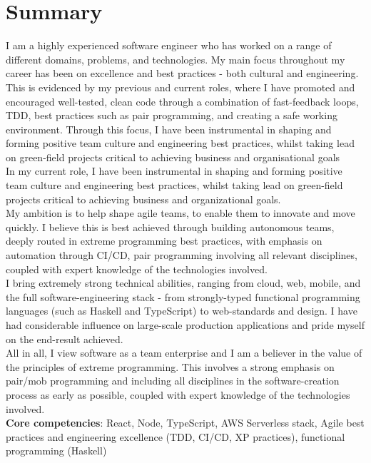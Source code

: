 \section{Summary}

I am a highly experienced software engineer who has worked on a range of different domains, problems, and technologies. My main focus throughout my career has been on excellence and best practices - both cultural and engineering.\\

This is evidenced by my previous and current roles, where I have promoted and encouraged well-tested, clean code through a combination of fast-feedback loops, TDD, best practices such as pair programming, and creating a safe working environment. Through this focus, I have been instrumental in shaping and forming positive team culture and engineering best practices, whilst taking lead on green-field projects critical to achieving business and organisational goals\\

In my current role, I have been instrumental in shaping and forming positive team culture and engineering best practices, whilst taking lead on green-field projects critical to achieving business and organizational goals.\\

My ambition is to help shape agile teams, to enable them to innovate and move quickly. I believe this is best achieved through building autonomous teams, deeply routed in extreme programming best practices, with emphasis on automation through CI/CD, pair programming involving all relevant disciplines, coupled with expert knowledge of the technologies involved.\\

I bring extremely strong technical abilities, ranging from cloud, web, mobile, and the full software-engineering stack - from strongly-typed functional programming languages (such as Haskell and TypeScript) to web-standards and design. I have had considerable influence on large-scale production applications and pride myself on the end-result achieved.\\

All in all, I view software as a team enterprise and I am a believer in the value of the principles of extreme programming. This involves a strong emphasis on pair/mob programming and including all disciplines in the software-creation process as early as possible, coupled with expert knowledge of the technologies involved.\\

\textbf{Core competencies}: React, Node, TypeScript, AWS Serverless stack, Agile best practices and engineering excellence (TDD, CI/CD, XP practices), functional programming (Haskell)

